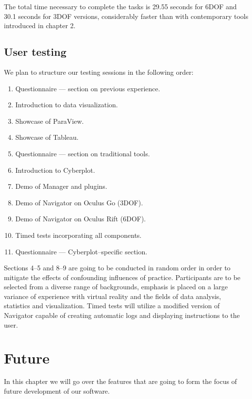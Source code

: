 \documentclass{article}
\begin{document}
The total time necessary to complete the tasks is 29.55 seconds for 6DOF and 30.1 seconds for 3DOF versions, considerably faster than with contemporary tools introduced in chapter 2.

\newpage

\subsection{User testing}

We plan to structure our testing sessions in the following order:

\begin{enumerate}
    \item Questionnaire --- section on previous experience.
    \item Introduction to data visualization.
    \item Showcase of ParaView.
    \item Showcase of Tableau.
    \item Questionnaire --- section on traditional tools.
    \item Introduction to Cyberplot.
    \item Demo of Manager and plugins.
    \item Demo of Navigator on Oculus Go (3DOF).
    \item Demo of Navigator on Oculus Rift (6DOF).
    \item Timed tests incorporating all components.
    \item Questionnaire --- Cyberplot--specific section.
\end{enumerate}

Sections 4--5 and 8--9 are going to be conducted in random order in order to mitigate the effects of confounding influences of practice. Participants are to be selected from a diverse range of backgrounds, emphasis is placed on a large variance of experience with virtual reality and the fields of data analysis, statistics and visualization. Timed tests will utilize a modified version of Navigator capable of creating automatic logs and displaying instructions to the user.

\section{Future}

In this chapter we will go over the features that are going to form the focus of future development of our software.
\end{document}
